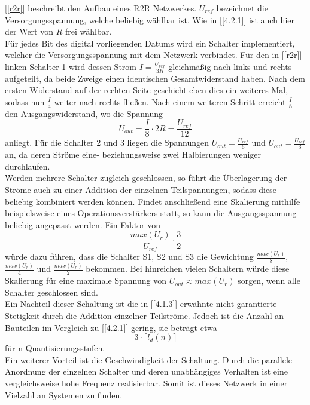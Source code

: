 [\ref{r2r}] beschreibt den Aufbau eines R2R Netzwerkes. $U_{ref}$ bezeichnet die Versorgungsspannung, welche beliebig wählbar ist. Wie in [\ref{4.2.1}] ist auch hier der Wert von $R$ frei wählbar.\\
Für jedes Bit des digital vorliegenden Datums wird ein Schalter implementiert, welcher die Versorgungsspannung mit dem Netzwerk verbindet. Für den in [\ref{r2r}] linken Schalter 1 wird dessen Strom $I = \frac{U_{ref}}{3R}$ gleichmäßig nach links und rechts aufgeteilt, da beide Zweige einen identischen Gesamtwiderstand haben. Nach dem ersten Widerstand auf der rechten Seite geschieht eben dies ein weiteres Mal, sodass nun $\frac{I}{4}$ weiter nach rechts fließen. Nach einem weiteren Schritt erreicht $\frac{I}{8}$ den Ausgangswiderstand, wo die Spannung $$U_{out} = \frac{I}{8}\cdot 2 R = \frac{U_{ref}}{12}$$ anliegt. Für die Schalter 2 und 3 liegen die Spannungen $U_{out} = \frac{U_{ref}}{6}$ und $U_{out} = \frac{U_{ref}}{3}$ an, da deren Ströme eine- beziehungsweise zwei Halbierungen weniger durchlaufen.\\
Werden mehrere Schalter zugleich geschlossen, so führt die Überlagerung der Ströme auch zu einer Addition der einzelnen Teilspannungen, sodass diese beliebig kombiniert werden können. Findet anschließend eine Skalierung mithilfe beispielsweise eines Operationsverstärkers statt, so kann die Ausgangsspannung beliebig angepasst werden. Ein Faktor von $$\frac{max(U_r)}{U_{ref}} \cdot \frac{3}{2}$$ würde dazu führen, dass die Schalter S1, S2 und S3 die Gewichtung $\frac{max(U_r)}{8}$, $\frac{max(U_r)}{4}$ und $\frac{max(U_r)}{2}$ bekommen. Bei hinreichen vielen Schaltern würde diese Skalierung für eine maximale Spannung von $U_{out} \approx max(U_r)$ sorgen, wenn alle Schalter geschlossen sind.\\
Ein Nachteil dieser Schaltung ist die in [\ref{4.1.3}] erwähnte nicht garantierte Stetigkeit durch die Addition einzelner Teilströme. Jedoch ist die Anzahl an Bauteilen im Vergleich zu [\ref{4.2.1}] gering, sie beträgt etwa $$3 \cdot \lceil l_d (n) \rceil$$ für n Quantisierungsstufen.\\
Ein weiterer Vorteil ist die Geschwindigkeit der Schaltung. Durch die parallele Anordnung der einzelnen Schalter und deren unabhängiges Verhalten ist eine vergleichsweise hohe Frequenz realisierbar. Somit ist dieses Netzwerk in einer Vielzahl an Systemen zu finden.
